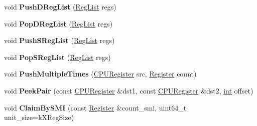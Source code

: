\begin{DoxyCompactItemize}
\item 
\mbox{\label{classv8_1_1internal_1_1MacroAssembler_a9aadf740b031f9ffaac387d463d815cc}} 
void {\bfseries Push\+D\+Reg\+List} (\mbox{\hyperlink{classuint32__t}{Reg\+List}} regs)
\item 
\mbox{\label{classv8_1_1internal_1_1MacroAssembler_ab5516487d7c5aa88c6e5760fed656248}} 
void {\bfseries Pop\+D\+Reg\+List} (\mbox{\hyperlink{classuint32__t}{Reg\+List}} regs)
\item 
\mbox{\label{classv8_1_1internal_1_1MacroAssembler_a426fe14202575949b412956de6893ed7}} 
void {\bfseries Push\+S\+Reg\+List} (\mbox{\hyperlink{classuint32__t}{Reg\+List}} regs)
\item 
\mbox{\label{classv8_1_1internal_1_1MacroAssembler_acd3bbe7c9ae4d125e43550205471d684}} 
void {\bfseries Pop\+S\+Reg\+List} (\mbox{\hyperlink{classuint32__t}{Reg\+List}} regs)
\item 
\mbox{\label{classv8_1_1internal_1_1MacroAssembler_a2974cf2c55c2dd62df0c31597baa2d27}} 
void {\bfseries Push\+Multiple\+Times} (\mbox{\hyperlink{classv8_1_1internal_1_1CPURegister}{C\+P\+U\+Register}} src, \mbox{\hyperlink{classv8_1_1internal_1_1Register}{Register}} count)
\item 
\mbox{\label{classv8_1_1internal_1_1MacroAssembler_ab6667be4c6fb8169bf7b67253dcc3ba3}} 
void {\bfseries Peek\+Pair} (const \mbox{\hyperlink{classv8_1_1internal_1_1CPURegister}{C\+P\+U\+Register}} \&dst1, const \mbox{\hyperlink{classv8_1_1internal_1_1CPURegister}{C\+P\+U\+Register}} \&dst2, \mbox{\hyperlink{classint}{int}} offset)
\item 
\mbox{\label{classv8_1_1internal_1_1MacroAssembler_a78e8227cc46275fa71b2fcd0b647b484}} 
void {\bfseries Claim\+By\+S\+MI} (const \mbox{\hyperlink{classv8_1_1internal_1_1Register}{Register}} \&count\+\_\+smi, uint64\+\_\+t unit\+\_\+size=k\+X\+Reg\+Size)
\item 
\mbox{\label{classv8_1_1internal_1_1MacroAssembler_a889f65bb5a2894a2b327670fc85a8852}} 

\end{DoxyCompactItemize}
